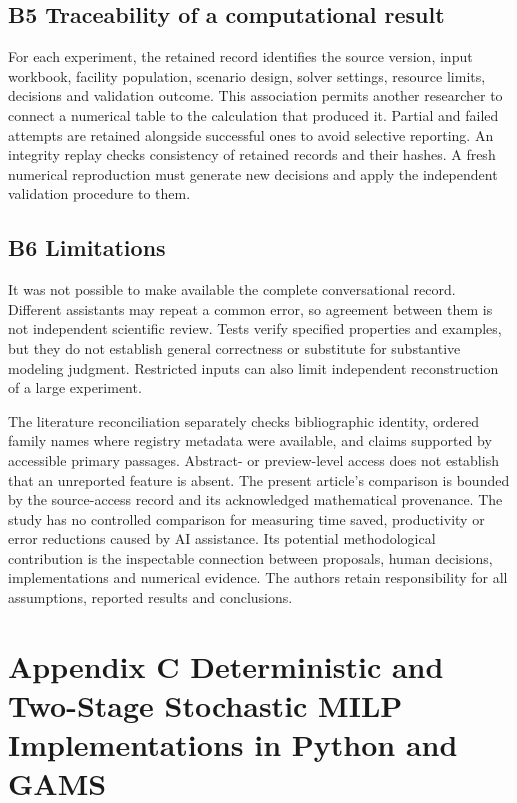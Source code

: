 \documentclass[
  english,
  11pt,
  a4paper,
]{article}
\begin{document}
\subsection{B5 Traceability of a computational
result}\label{b5-traceability-of-a-computational-result}

For each experiment, the retained record identifies the source version, input workbook, facility population, scenario design, solver settings, resource limits, decisions and validation outcome. This association
permits another researcher to connect a numerical table to the calculation that produced it. Partial and failed attempts are retained alongside successful ones to avoid selective reporting.
An integrity replay checks consistency of retained records and their hashes. A fresh numerical reproduction must generate new decisions and apply the independent validation procedure to them.

\subsection{B6 Limitations}\label{b6-limitations}

It was not possible to make available the complete conversational record. Different assistants may repeat
a common error, so agreement between them is not independent scientific review. Tests verify specified properties and examples, but they do not establish general correctness or substitute for substantive modeling judgment. Restricted inputs can also limit independent reconstruction of a large experiment.

The literature reconciliation separately checks bibliographic identity, ordered family names where registry metadata were available, and claims
supported by accessible primary passages. Abstract- or preview-level access does not establish that an unreported feature is absent. The present
article's comparison is bounded by the source-access record and its acknowledged mathematical provenance.
The study has no controlled comparison for measuring time saved, productivity or error reductions caused by AI assistance. Its potential methodological contribution is the inspectable connection between
proposals, human decisions, implementations and numerical evidence. The authors retain responsibility for all assumptions, reported results and
conclusions.

\newpage{}

\section{Appendix C Deterministic and Two-Stage Stochastic MILP
Implementations in Python and
GAMS}\label{appendix-c-deterministic-and-two-stage-stochastic-milp-implementations-in-python-and-gams}
\end{document}
